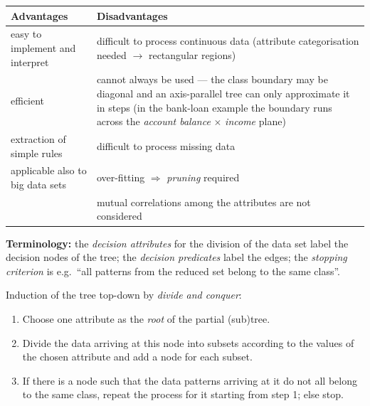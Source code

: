 \documentclass[11pt,a4paper]{article}
\theoremstyle{definition}
\providecommand{\uv}[1]{``#1''}
\begin{document}
\begin{center}
\small
\begin{tabular}{@{}p{7.4cm}p{8.2cm}@{}}
\toprule
\textbf{Advantages} & \textbf{Disadvantages} \\
\midrule
easy to implement and interpret & difficult to process continuous data (attribute categorisation
  needed $\to$ rectangular regions) \\
efficient & cannot always be used --- the class boundary may be diagonal and an axis-parallel
  tree can only approximate it in steps (in the bank-loan example the boundary runs across the
  \emph{account balance} $\times$ \emph{income} plane) \\
extraction of simple rules & difficult to process missing data \\
applicable also to big data sets & over-fitting $\Rightarrow$ \emph{pruning} required \\
  & mutual correlations among the attributes are not considered \\
\bottomrule
\end{tabular}
\end{center}

\textbf{Terminology:} the \emph{decision attributes} for the division of the data set label the
decision nodes of the tree; the \emph{decision predicates} label the edges; the \emph{stopping
criterion} is e.g.\ \uv{all patterns from the reduced set belong to the same class}.

\begin{defbox}
Induction of the tree top-down by \emph{divide and conquer}:
\begin{enumerate}
\item Choose one attribute as the \emph{root} of the partial (sub)tree.
\item Divide the data arriving at this node into subsets according to the values of the chosen
      attribute and add a node for each subset.
\item If there is a node such that the data patterns arriving at it do not all belong to the same
      class, repeat the process for it starting from step 1; else stop.
\end{enumerate}
\end{defbox}
\end{document}
